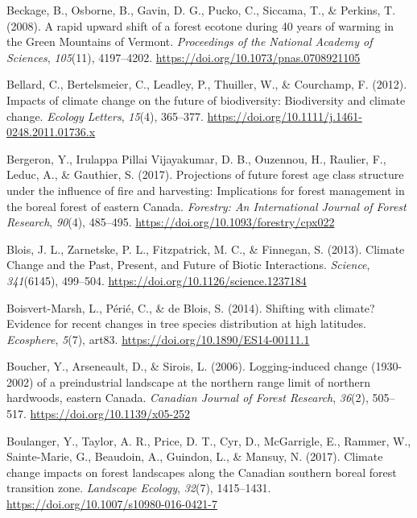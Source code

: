 \documentclass[
]{article}
\begin{document}
\leavevmode\hypertarget{ref-beckage_rapid_2008}{}%
Beckage, B., Osborne, B., Gavin, D. G., Pucko, C., Siccama, T., \&
Perkins, T. (2008). A rapid upward shift of a forest ecotone during 40
years of warming in the Green Mountains of Vermont. \emph{Proceedings of
the National Academy of Sciences}, \emph{105}(11), 4197--4202.
\url{https://doi.org/10.1073/pnas.0708921105}

\leavevmode\hypertarget{ref-bellard_impacts_2012}{}%
Bellard, C., Bertelsmeier, C., Leadley, P., Thuiller, W., \& Courchamp,
F. (2012). Impacts of climate change on the future of biodiversity:
Biodiversity and climate change. \emph{Ecology Letters}, \emph{15}(4),
365--377. \url{https://doi.org/10.1111/j.1461-0248.2011.01736.x}

\leavevmode\hypertarget{ref-bergeron_projections_2017}{}%
Bergeron, Y., Irulappa Pillai Vijayakumar, D. B., Ouzennou, H., Raulier,
F., Leduc, A., \& Gauthier, S. (2017). Projections of future forest age
class structure under the influence of fire and harvesting: Implications
for forest management in the boreal forest of eastern Canada.
\emph{Forestry: An International Journal of Forest Research},
\emph{90}(4), 485--495. \url{https://doi.org/10.1093/forestry/cpx022}

\leavevmode\hypertarget{ref-blois_climate_2013}{}%
Blois, J. L., Zarnetske, P. L., Fitzpatrick, M. C., \& Finnegan, S.
(2013). Climate Change and the Past, Present, and Future of Biotic
Interactions. \emph{Science}, \emph{341}(6145), 499--504.
\url{https://doi.org/10.1126/science.1237184}

\leavevmode\hypertarget{ref-boisvert-marsh_shifting_2014}{}%
Boisvert-Marsh, L., Périé, C., \& de Blois, S. (2014). Shifting with
climate? Evidence for recent changes in tree species distribution at
high latitudes. \emph{Ecosphere}, \emph{5}(7), art83.
\url{https://doi.org/10.1890/ES14-00111.1}

\leavevmode\hypertarget{ref-boucher_logging-induced_2006}{}%
Boucher, Y., Arseneault, D., \& Sirois, L. (2006). Logging-induced
change (1930-2002) of a preindustrial landscape at the northern range
limit of northern hardwoods, eastern Canada. \emph{Canadian Journal of
Forest Research}, \emph{36}(2), 505--517.
\url{https://doi.org/10.1139/x05-252}

\leavevmode\hypertarget{ref-boulanger_climate_2017}{}%
Boulanger, Y., Taylor, A. R., Price, D. T., Cyr, D., McGarrigle, E.,
Rammer, W., Sainte-Marie, G., Beaudoin, A., Guindon, L., \& Mansuy, N.
(2017). Climate change impacts on forest landscapes along the Canadian
southern boreal forest transition zone. \emph{Landscape Ecology},
\emph{32}(7), 1415--1431.
\url{https://doi.org/10.1007/s10980-016-0421-7}
\end{document}
